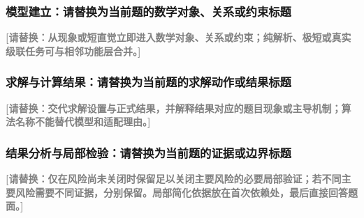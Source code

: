 \documentclass[12pt,a4paper]{ctexart}
\newcommand{\placeholder}[1]{\textcolor{gray}{\textbf{[请替换：#1]}}}
\begin{document}
\subsubsection{模型建立：请替换为当前题的数学对象、关系或约束标题}
\placeholder{从现象或短直觉立即进入数学对象、关系或约束；纯解析、极短或真实级联任务可与相邻功能层合并。}
\subsubsection{求解与计算结果：请替换为当前题的求解动作或结果标题}
\placeholder{交代求解设置与正式结果，并解释结果对应的题目现象或主导机制；算法名称不能替代模型和适配理由。}
\subsubsection{结果分析与局部检验：请替换为当前题的证据或边界标题}
\placeholder{仅在风险尚未关闭时保留足以关闭主要风险的必要局部验证；若不同主要风险需要不同证据，分别保留。局部简化依据放在首次依赖处，最后直接回答题面。}
\end{document}
